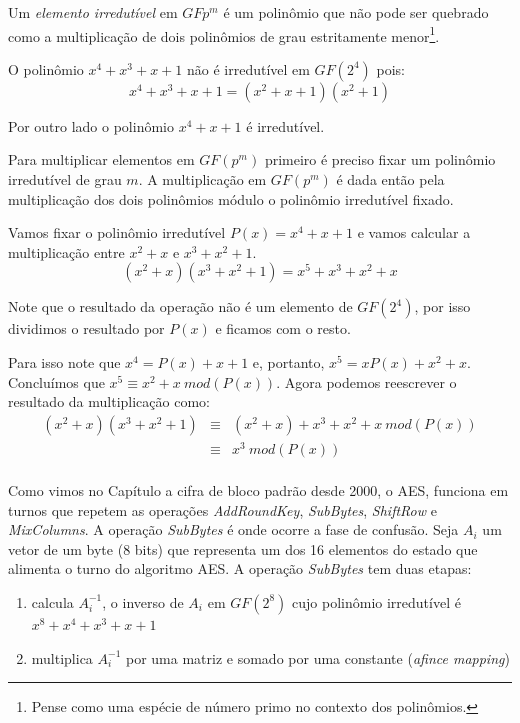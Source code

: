 Um {\em elemento irredutível} em $GF{p^m}$ é um polinômio que não pode ser quebrado como a multiplicação de dois polinômios de grau estritamente menor\footnote{Pense como uma espécie de número primo no contexto dos polinômios.}. 

\begin{example}
  O polinômio $x^4 + x^3 + x + 1$ não é irredutível em $GF(2^4)$ pois:
\begin{displaymath}
  x^4 + x^3 + x + 1 = (x^2 + x + 1)(x^2 + 1)
\end{displaymath}

Por outro lado o polinômio $x^4 + x + 1$ é irredutível.
\end{example}

Para multiplicar elementos em $GF(p^m)$ primeiro é preciso fixar um polinômio irredutível de grau $m$.
A multiplicação em $GF(p^m)$ é dada então pela multiplicação dos dois polinômios módulo o polinômio irredutível fixado.


\begin{example}
  Vamos fixar o polinômio irredutível $P(x) = x^4 + x + 1$ e vamos calcular a multiplicação entre $x^2 + x$ e $x^3 + x^2 + 1$.
  \begin{displaymath}
    (x^2 + x)(x^3 + x^2 + 1) = x^5  + x^3 + x^2  + x
  \end{displaymath}

  Note que o resultado da operação não é um elemento de $GF(2^4)$, por isso dividimos o resultado por $P(x)$ e ficamos com o resto.

Para isso note que $x^4 = P(x) + x + 1$ e, portanto, $x^5 = xP(x) + x^2 + x$. 
Concluímos que $x^5 \equiv x^2 + x\ mod(P(x))$.
Agora podemos reescrever o resultado da multiplicação como:
\begin{eqnarray*}
  (x^2 + x)(x^3 + x^2 + 1) & \equiv & (x^2 + x) + x^3 + x^2 + x\ mod(P(x))\\
                           & \equiv & x^3 \ mod(P(x))\\
\end{eqnarray*}
\end{example}

Como vimos no Capítulo \label{sec:aes} a cifra de bloco padrão desde 2000, o AES, funciona em turnos que repetem as operações {\em AddRoundKey}, {\em SubBytes}, {\em ShiftRow} e {\em MixColumns}.
A operação {\em SubBytes} é onde ocorre a fase de confusão.
Seja $A_i$ um vetor de um byte (8 bits) que representa um dos 16 elementos do estado que alimenta o turno do algoritmo AES.
A operação {\em SubBytes} tem duas etapas:
\begin{enumerate}
\item calcula $A_i^{-1}$, o inverso de $A_i$ em $GF(2^8)$ cujo polinômio irredutível é $x^8 + x^4 + x^3 + x + 1$
\item multiplica $A_i^{-1}$ por uma matriz e somado por uma constante ({\em afince mapping})
\end{enumerate}

